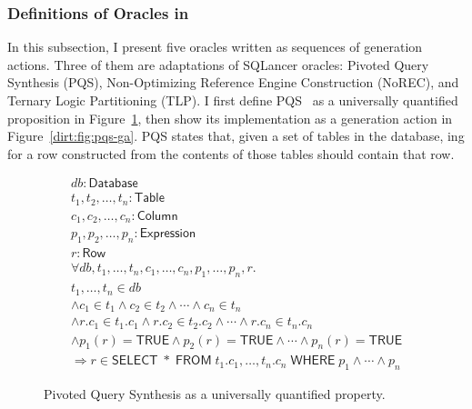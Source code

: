 \subsubsection{Definitions of Oracles in \tool{}}

In this subsection, I present five oracles written as sequences of generation actions.
Three of them are adaptations of SQLancer oracles: Pivoted Query Synthesis (PQS),
Non-Optimizing Reference Engine Construction (NoREC), and Ternary Logic Partitioning
(TLP). I first define PQS~\cite{rigger.pqs} as a universally quantified proposition in
Figure~\ref{dirt:fig:pqs}, then show its implementation as a generation action in
Figure~\ref{dirt:fig:pqs-ga}. PQS states that, given a set of tables in the database,
ing for a row constructed from the contents of those tables should contain
that row.

\begin{figure}[h!]
  \[
    \begin{array}{l}
      \mathit{db}: \mathsf{Database}                                                                \\
      t_1, t_2,\ldots,t_n : \mathsf{Table}                                                          \\
      c_1, c_2,\ldots,c_n : \mathsf{Column}                                                         \\
      p_1, p_2,\ldots,p_n : \mathsf{Expression}                                                     \\
      r : \mathsf{Row}                                                                               \\
      \forall \mathit{db}, t_1,\ldots,t_n, c_1,\ldots,c_n, p_1,\ldots,p_n, r.                        \\
      t_1,\ldots,t_n \in \mathit{db}                                                                 \\
      \land c_1 \in t_1 \land c_2 \in t_2 \land \cdots \land c_n \in t_n                             \\
      \land r.c_1 \in t_1.c_1 \land r.c_2 \in t_2.c_2 \land \cdots \land r.c_n \in t_n.c_n           \\
      \land p_1(r) = \mathsf{TRUE} \land p_2(r) = \mathsf{TRUE} \land \cdots \land p_n(r) = \mathsf{TRUE} \\
      \Rightarrow r \in
      \mathsf{SELECT}\; *\; \mathsf{FROM}\; t_1.c_1,\ldots,t_n.c_n\; \mathsf{WHERE}\; p_1 \land \cdots \land p_n
    \end{array}
  \]
  \caption{Pivoted Query Synthesis as a universally quantified property.}
  \label{dirt:fig:pqs}
\end{figure}


